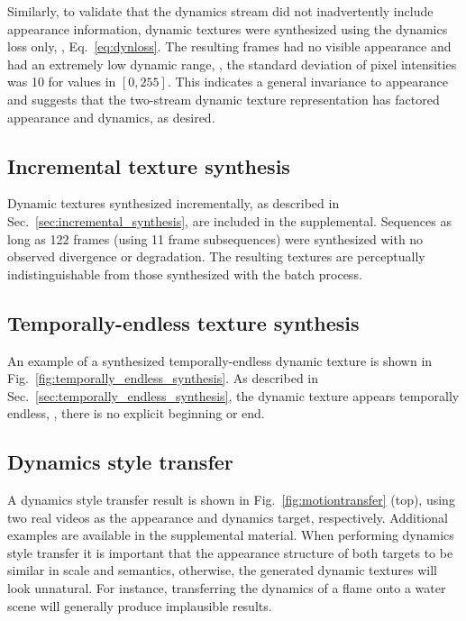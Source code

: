 Similarly, to validate that the dynamics stream did not 
inadvertently include appearance information, dynamic textures were synthesized
using the dynamics loss only, \ie, Eq.\ \ref{eq:dynloss}.
The resulting frames had no visible appearance and had
an extremely low dynamic range, \ie, the standard
deviation of pixel intensities was 10 for values in $[0,255]$. 
This indicates a general invariance to appearance and 
suggests that the two-stream dynamic texture representation
has factored appearance and dynamics, as desired.



\subsection{Incremental texture synthesis}

Dynamic textures synthesized incrementally, as described in Sec.\
\ref{sec:incremental_synthesis}, are included in the supplemental.
Sequences as long as 122 frames (using 11 frame subsequences) were synthesized
with no observed divergence or degradation. The resulting textures are 
perceptually indistinguishable from those synthesized with the batch process. 

\subsection{Temporally-endless texture synthesis}

An example of a synthesized temporally-endless dynamic texture is shown in
Fig.\ \ref{fig:temporally_endless_synthesis}. As described in Sec.\ 
\ref{sec:temporally_endless_synthesis}, the dynamic texture appears
temporally endless, \ie, there is no explicit beginning or end.



\subsection{Dynamics style transfer}

A dynamics style transfer result is shown in Fig.\ 
\ref{fig:motiontransfer} (top), using two real videos as the appearance and dynamics target, respectively.
Additional examples are available in the supplemental material. 
When performing dynamics style transfer it is important
that the appearance structure of both targets to be similar in scale and semantics,
otherwise, the generated dynamic textures will look unnatural.
For instance, transferring the dynamics of a flame onto a water 
scene will generally produce implausible results. 

